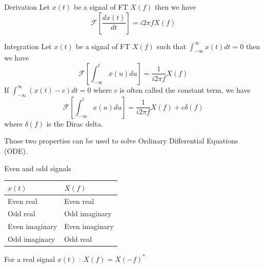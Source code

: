\begin{block}{Derivation}
    Let $x(t)$ be a signal of FT $X(f)$ then we have 
  $$
  \mathcal{F}\left[\frac{d x(t)}{ dt }\right]=  i 2 \pi f X(f)
  $$
  \end{block}
  
  
  \begin{block}{Integration}
    Let $x(t)$ be a signal of FT $X(f)$ such that
    $\int_{-\infty}^\infty x(t) dt = 0$ then we have
  $$
  \mathcal{F}\left[\int_{-\infty}^t x(u) du \right]= \frac{1}{i 2 \pi f }  X(f)
  $$
  If   $\int_{-\infty}^\infty (x(t)-c) dt = 0$ where $c$ is often called the constant term, we have
  $$
  \mathcal{F}\left[\int_{-\infty}^t x(u) du \right]= \frac{1}{i 2 \pi f }  X(f)+ c\delta(f)
  $$
  where $\delta(f)$ is the Dirac delta.
  \end{block}

  Those two properties can be used to solve Ordinary Differential Equations
  (ODE).
  


\begin{block}{Even and odd signals}
    \begin{center}
      \begin{tabular}{|l|l|}
        \hline
        $x(t)$ & $X(f)$\\ \hline
        Even real & Even real \\
        Odd real & Odd imaginary \\
        Even imaginary & Even imaginary\\
        Odd imaginary & Odd real\\ \hline
      \end{tabular}
    
      
    \end{center}
    For a real signal $x(t)$ : $X(f)=X(-f)^*$ 
    \end{block}
    
    
    
